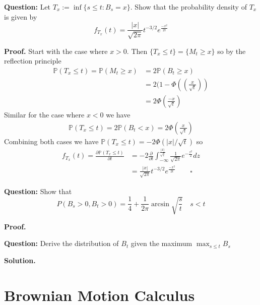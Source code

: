 \documentclass{article}
\begin{document}
\begin{tcolorbox}[colframe=black,colback=gray!5,boxrule=0.5pt]
    \textbf{Question:} Let $T_x :=\inf\{s\leq t: B_s=x\}$. Show that the probability density of $T_x$ is given by
    $$f_{T_x}(t) = \frac{|x|}{\sqrt{2\pi}} t^{-3/2} e^{\frac{-x^2}{2t}}$$
\end{tcolorbox}
\textbf{Proof.} Start with the case where $x>0$. Then $\{T_x\leq t\} = \{M_t\geq x\}$ so by the reflection principle
\begin{align*}
    \mathbb{P}(T_x\leq t) = \mathbb{P}(M_t\geq x) &= 2\mathbb{P}(B_t\geq x) \\
    &= 2(1 - \Phi\left(\left(\frac{x}{\sqrt{t}}\right)\right) \\
    &= 2\Phi\left(\frac{-x}{\sqrt{t}}\right)
\end{align*}
Similar for the case where $x<0$ we have
\begin{align*}
    \mathbb{P}(T_x\leq t) = 2\mathbb{P}(B_t < x) = 2\Phi\left(\frac{x}{\sqrt{t}}\right)    
\end{align*}
Combining both cases we have $\mathbb{P}(T_x\leq t) = -2\Phi(|x|/\sqrt{t})$ so 
\begin{align*}
    f_{T_x}(t) = \frac{\partial \mathbb{P}(T_x\leq t)}{\partial t} &=-2\frac{\partial}{\partial t}\int_{-\infty}^{\frac{|x|}{\sqrt{t}}}\frac{1}{\sqrt{2\pi}}e^{-\frac{z^2}{2}}dz \\
    &= \frac{|x|}{\sqrt{2\pi}} t^{-3/2} e^{\frac{-x^2}{2t}} \quad\quad \square
\end{align*}


\begin{tcolorbox}[colframe=black,colback=gray!5,boxrule=0.5pt]
    \textbf{Question:} Show that 
    $$P(B_s>0,B_t>0) = \frac{1}{4} + \frac{1}{2\pi}\arcsin{\sqrt{\frac{s}{t}}} \quad s<t$$
\end{tcolorbox}
\textbf{Proof.}


\begin{tcolorbox}[colframe=black,colback=gray!5,boxrule=0.5pt]
    \textbf{Question:} Derive the distribution of $B_t$  given the maximum $\max_{s\leq t} B_s$
\end{tcolorbox}
\textbf{Solution.}


\newpage
\section{Brownian Motion Calculus}
\end{document}
